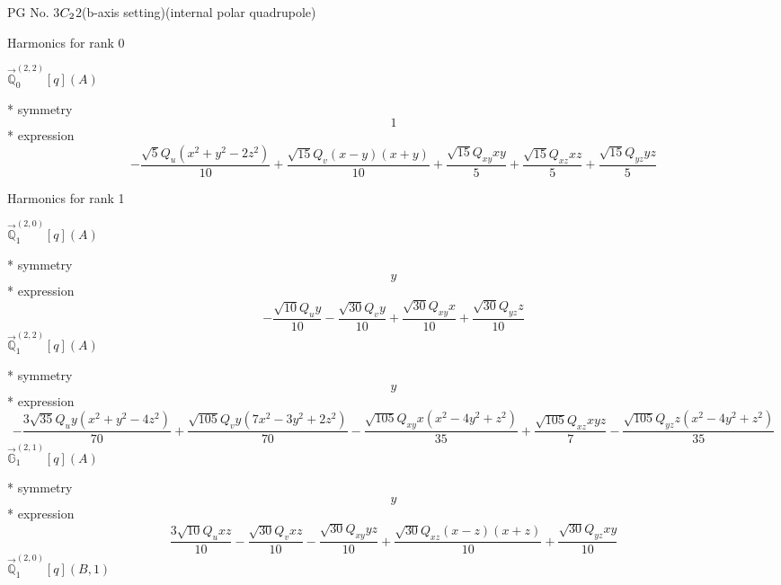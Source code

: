 \documentclass[fleqn,8pt]{jsarticle}
\begin{document}
\setcounter{MaxMatrixCols}{32}

\renewcommand{\tablename}{Table~}
\renewcommand{\figurename}{Figure~}
\begin{center}
\LARGE
PG No. 3\quad$C_{\rm 2}$\quad$2$\quad(b-axis setting)\quad[ monoclinic ] (internal polar quadrupole)
\end{center}

\noindent * Harmonics for rank 0

\noindent\quad $\vec{\mathbb{Q}}_{0}^{(2,2)}[q](A)$

\noindent\quad ** symmetry
\begin{dmath*}
1
\end{dmath*}
\noindent\quad ** expression
\begin{dmath*}
- \frac{\sqrt{5} Q_{u} \left(x^{2} + y^{2} - 2 z^{2}\right)}{10} + \frac{\sqrt{15} Q_{v} \left(x - y\right) \left(x + y\right)}{10} + \frac{\sqrt{15} Q_{xy} x y}{5} + \frac{\sqrt{15} Q_{xz} x z}{5} + \frac{\sqrt{15} Q_{yz} y z}{5}
\end{dmath*}

\noindent * Harmonics for rank 1

\noindent\quad $\vec{\mathbb{Q}}_{1}^{(2,0)}[q](A)$

\noindent\quad ** symmetry
\begin{dmath*}
y
\end{dmath*}
\noindent\quad ** expression
\begin{dmath*}
- \frac{\sqrt{10} Q_{u} y}{10} - \frac{\sqrt{30} Q_{v} y}{10} + \frac{\sqrt{30} Q_{xy} x}{10} + \frac{\sqrt{30} Q_{yz} z}{10}
\end{dmath*}
\noindent\quad $\vec{\mathbb{Q}}_{1}^{(2,2)}[q](A)$

\noindent\quad ** symmetry
\begin{dmath*}
y
\end{dmath*}
\noindent\quad ** expression
\begin{dmath*}
- \frac{3 \sqrt{35} Q_{u} y \left(x^{2} + y^{2} - 4 z^{2}\right)}{70} + \frac{\sqrt{105} Q_{v} y \left(7 x^{2} - 3 y^{2} + 2 z^{2}\right)}{70} - \frac{\sqrt{105} Q_{xy} x \left(x^{2} - 4 y^{2} + z^{2}\right)}{35} + \frac{\sqrt{105} Q_{xz} x y z}{7} - \frac{\sqrt{105} Q_{yz} z \left(x^{2} - 4 y^{2} + z^{2}\right)}{35}
\end{dmath*}
\noindent\quad $\vec{\mathbb{G}}_{1}^{(2,1)}[q](A)$

\noindent\quad ** symmetry
\begin{dmath*}
y
\end{dmath*}
\noindent\quad ** expression
\begin{dmath*}
\frac{3 \sqrt{10} Q_{u} x z}{10} - \frac{\sqrt{30} Q_{v} x z}{10} - \frac{\sqrt{30} Q_{xy} y z}{10} + \frac{\sqrt{30} Q_{xz} \left(x - z\right) \left(x + z\right)}{10} + \frac{\sqrt{30} Q_{yz} x y}{10}
\end{dmath*}
\noindent\quad $\vec{\mathbb{Q}}_{1}^{(2,0)}[q](B,1)$
\end{document}
